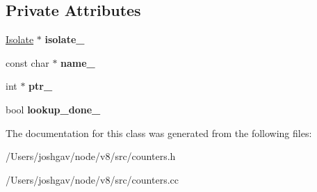 \subsection*{Private Attributes}
\begin{DoxyCompactItemize}
\item 
\hyperlink{classv8_1_1internal_1_1_isolate}{Isolate} $\ast$ {\bfseries isolate\+\_\+}\hypertarget{classv8_1_1internal_1_1_stats_counter_a73e5a782372134ee01026c2b87479ef7}{}\label{classv8_1_1internal_1_1_stats_counter_a73e5a782372134ee01026c2b87479ef7}

\item 
const char $\ast$ {\bfseries name\+\_\+}\hypertarget{classv8_1_1internal_1_1_stats_counter_a21ece861424639d924a5ebb10e4ad4fb}{}\label{classv8_1_1internal_1_1_stats_counter_a21ece861424639d924a5ebb10e4ad4fb}

\item 
int $\ast$ {\bfseries ptr\+\_\+}\hypertarget{classv8_1_1internal_1_1_stats_counter_a1cebdc748620b53d293cc40e35c13fbe}{}\label{classv8_1_1internal_1_1_stats_counter_a1cebdc748620b53d293cc40e35c13fbe}

\item 
bool {\bfseries lookup\+\_\+done\+\_\+}\hypertarget{classv8_1_1internal_1_1_stats_counter_ad8b05e60df2f8bc57635bc60ccc9411c}{}\label{classv8_1_1internal_1_1_stats_counter_ad8b05e60df2f8bc57635bc60ccc9411c}

\end{DoxyCompactItemize}


The documentation for this class was generated from the following files\+:\begin{DoxyCompactItemize}
\item 
/\+Users/joshgav/node/v8/src/counters.\+h\item 
/\+Users/joshgav/node/v8/src/counters.\+cc\end{DoxyCompactItemize}
